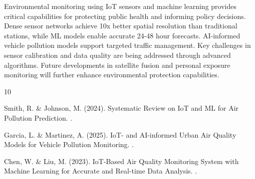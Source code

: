 \documentclass[12pt,a4paper]{article}
\begin{document}
Environmental monitoring using IoT sensors and machine learning provides critical capabilities for protecting public health and informing policy decisions. Dense sensor networks achieve 10x better spatial resolution than traditional stations, while ML models enable accurate 24-48 hour forecasts. AI-informed vehicle pollution models support targeted traffic management. Key challenges in sensor calibration and data quality are being addressed through advanced algorithms. Future developments in satellite fusion and personal exposure monitoring will further enhance environmental protection capabilities.


\begin{thebibliography}{10}

Smith, R. \& Johnson, M. (2024).
\newblock Systematic Review on IoT and ML for Air Pollution Prediction.
.

Garcia, L. \& Martinez, A. (2025).
\newblock IoT- and AI-informed Urban Air Quality Models for Vehicle Pollution Monitoring.
.

Chen, W. \& Liu, M. (2023).
\newblock IoT-Based Air Quality Monitoring System with Machine Learning for Accurate and Real-time Data Analysis.
.

\end{thebibliography}
\end{document}
